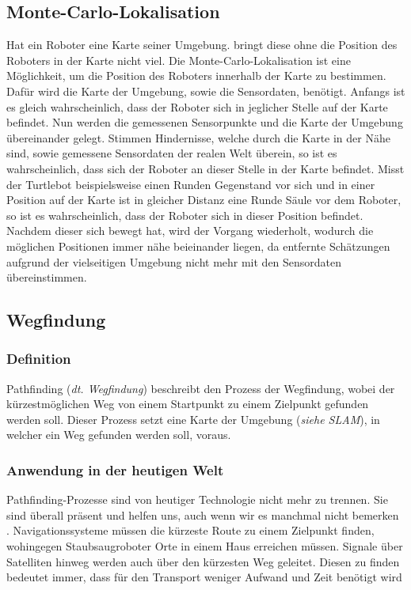 {{{{		}
	}

	\subsection{Monte-Carlo-Lokalisation}
	{ 
		Hat ein Roboter eine Karte seiner Umgebung. bringt diese ohne die Position des Roboters in der Karte nicht viel. Die Monte-Carlo-Lokalisation ist eine Möglichkeit, um die Position des Roboters innerhalb der Karte zu bestimmen.  Dafür wird die Karte der Umgebung, sowie die Sensordaten, benötigt. Anfangs ist es gleich wahrscheinlich, dass der Roboter sich in jeglicher Stelle auf der Karte befindet. Nun werden die gemessenen Sensorpunkte und die Karte der Umgebung übereinander gelegt. Stimmen Hindernisse, welche durch die Karte in der Nähe sind, sowie gemessene Sensordaten der realen Welt überein, so ist es wahrscheinlich, dass sich der Roboter an dieser Stelle in der Karte befindet. Misst der Turtlebot beispielsweise einen Runden Gegenstand vor sich und in einer Position auf der Karte ist in gleicher Distanz eine Runde Säule vor dem Roboter, so ist es wahrscheinlich, dass der Roboter sich in dieser Position befindet. Nachdem dieser sich bewegt hat, wird der Vorgang wiederholt, wodurch die möglichen Positionen immer nähe beieinander liegen, da entfernte Schätzungen aufgrund der vielseitigen Umgebung nicht mehr mit den Sensordaten übereinstimmen. 
	}
	\subsection{Wegfindung}
	{
		\subsubsection{Definition}
		{
			Pathfinding (\textit{dt. Wegfindung}) beschreibt den Prozess der Wegfindung, wobei der kürzestmöglichen Weg von einem Startpunkt zu einem Zielpunkt gefunden werden soll. Dieser Prozess setzt eine Karte der Umgebung (\textit{siehe SLAM}), in welcher ein Weg gefunden werden soll, voraus.
		}
		
		\subsubsection{Anwendung in der heutigen Welt}
		{
			Pathfinding-Prozesse sind von heutiger Technologie nicht mehr zu trennen. Sie sind überall präsent und helfen uns, auch wenn wir es manchmal nicht bemerken . Navigationssysteme müssen die kürzeste Route zu einem Zielpunkt finden, wohingegen Staubsaugroboter Orte in einem Haus erreichen müssen. Signale über Satelliten hinweg werden auch über den kürzesten Weg geleitet. Diesen zu finden bedeutet immer, dass für den Transport weniger Aufwand und Zeit benötigt wird
		}
		
}}}
